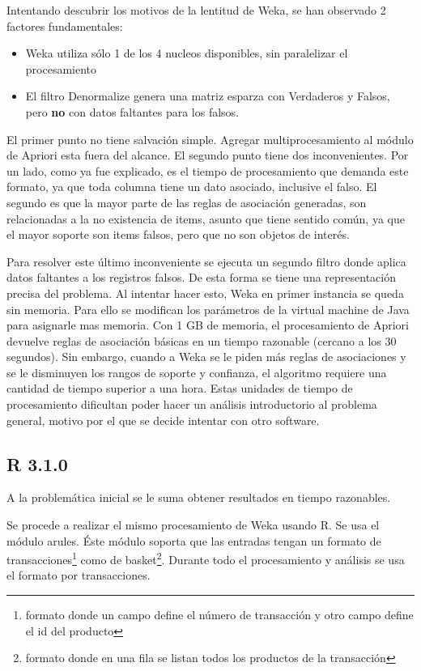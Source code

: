 \documentclass[journal]{IEEEtran}
\begin{document}
Intentando descubrir los motivos de la lentitud de Weka, se han observado 2 factores fundamentales:
\begin{itemize}
	\item Weka utiliza sólo 1 de los 4 nucleos disponibles, sin paralelizar el procesamiento
	\item El filtro Denormalize genera una matriz esparza con Verdaderos y Falsos, pero \textbf{no} con
	datos faltantes para los falsos. 
\end{itemize}

El primer punto no tiene salvación simple. Agregar multiprocesamiento al módulo de Apriori esta
fuera del alcance.
El segundo punto tiene dos inconvenientes. Por un lado, como ya fue explicado, es el tiempo de 
procesamiento que demanda este formato, ya que toda columna tiene un dato asociado, inclusive el falso. 
El segundo es que la mayor parte de las reglas de asociación
generadas, son relacionadas a la no existencia de items, asunto que tiene sentido común, ya que
el mayor soporte son items falsos, pero que no son objetos de interés. 

Para resolver este último inconveniente se ejecuta un segundo filtro donde aplica datos faltantes 
a los registros falsos. De esta forma se tiene una representación precisa del problema. Al intentar 
hacer esto, Weka en primer instancia se queda sin memoria. Para ello se modifican los parámetros de
la virtual machine de Java para asignarle mas memoria. Con 1 GB de memoria, el procesamiento de
Apriori devuelve reglas de asociación básicas en un tiempo razonable (cercano a los 30 segundos). 
Sin embargo, cuando a Weka se le piden más reglas de asociaciones y se le disminuyen los rangos de 
soporte y confianza, el algoritmo requiere una cantidad de tiempo superior a una hora. Estas unidades
de tiempo de procesamiento dificultan poder hacer un análisis introductorio al problema general,
motivo por el que se decide intentar con otro software.


\subsection{R 3.1.0}
A la problemática inicial se le suma obtener resultados en tiempo razonables. 

Se procede a realizar el mismo procesamiento de Weka usando R. Se usa el módulo arules. Éste 
módulo soporta que las entradas tengan un formato de transacciones\footnote{formato donde un 
campo define el número de transacción y otro campo define el id del producto}
como de basket\footnote{formato donde en una fila se listan todos los productos de la transacción}.
Durante todo el procesamiento y análisis se usa el formato por transacciones.
\end{document}
